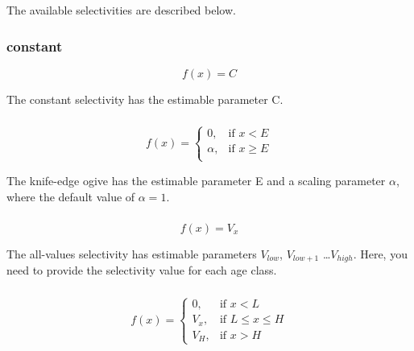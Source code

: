 The available selectivities are described below.

\subsubsection[Constant]{{constant}}

\begin{equation}
f(x)=C
\end{equation}

The constant selectivity has the estimable parameter C. 

\subsubsection[Knife-edge]{}
\begin{equation}
f(x)= \begin{cases}
  0, & \text{if $x < E$} \\
  \alpha, & \text{if $x \ge E$}\\ 
  \end{cases} 
\end{equation}

The knife-edge ogive has the estimable parameter E and a scaling parameter $\alpha$, where the default value of $\alpha = 1$.

\subsubsection[All-values]{}

\begin{equation}
f(x)=V_x
\end{equation}

The all-values selectivity has estimable parameters $V_{low}$, $V_{low+1}$ \ldots $V_{high}$. Here, you need to provide the selectivity value for each age class.

\subsubsection[All-values-bounded]{}

\begin{equation}
f(x)=\begin{cases}
		 0, & \text{if $x < L$} \\
		 V_x, & \text{if $L \le x \le H$} \\
		 V_H, & \text{if $x > H$}
  \end{cases}
\end{equation}

